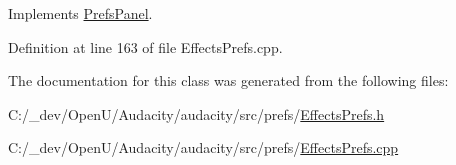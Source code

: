 Implements \hyperlink{class_prefs_panel_ab5572aedab201c47fbbdf714c6a2b781}{Prefs\+Panel}.



Definition at line 163 of file Effects\+Prefs.\+cpp.



The documentation for this class was generated from the following files\+:\begin{DoxyCompactItemize}
\item 
C\+:/\+\_\+dev/\+Open\+U/\+Audacity/audacity/src/prefs/\hyperlink{_effects_prefs_8h}{Effects\+Prefs.\+h}\item 
C\+:/\+\_\+dev/\+Open\+U/\+Audacity/audacity/src/prefs/\hyperlink{_effects_prefs_8cpp}{Effects\+Prefs.\+cpp}\end{DoxyCompactItemize}
